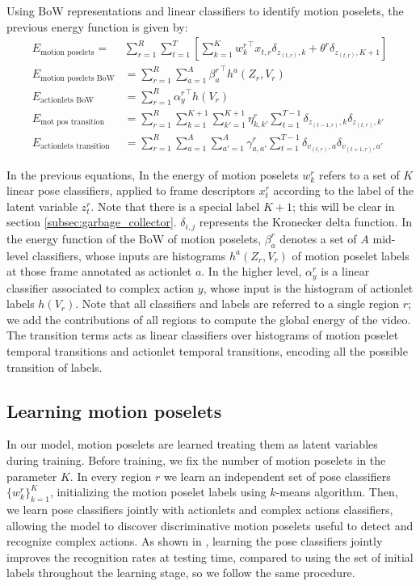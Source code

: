 Using BoW representations and linear classifiers to identify motion poselets, 
the previous energy function is given by:
{\small
\begin{align}
\label{eq:motionposelets}E_{\text{motion poselets}}  =  &\sum_{r=1}^R\sum_{t=1}^T  \left[ \sum_{k=1}^K {w^r_k}^\top 
x_{t,r}\delta_{z_{(t,r)},k} + \theta^r \delta_{z_{(t,r)},K+1}\right] \\
E_{\text{motion poselets BoW}} & = \sum_{r=1}^R \sum_{a=1}^A {\beta^r_{a}}^\top 
h^{a}(Z_r,V_r) \\
\label{eq:actionlets_BoW} E_{\text{actionlets BoW}} &=\sum_{r=1}^R {\alpha^r_{y}}^\top h(V_r)  \\
E_{\text{mot pos transition}} & = \sum_{r=1}^R\sum_{k=1}^{K+1}\sum_{k'=1}^{K+1} \eta^r_{k,k'} 
\sum_{t=1}^{T-1} \delta_{z_{(t-1,r)},k}\delta_{z_{(t,r)},k'}\\
E_{\text{actionlets transition}} & =\sum_{r=1}^R\sum_{a=1}^A\sum_{a'=1}^A \gamma^r_{a,a'} 
\sum_{t=1}^{T-1} 
\delta_{v_{(t,r)},a}\delta_{v_{(t+1,r)},a'} 
\end{align}
}


In the previous equations, In the energy of motion poselets $w^r_k$ refers to a set of $K$ linear pose classifiers, applied to frame descriptors $x_t^r$ according to the label of the latent variable $z_t^r$. Note that there is a special label $K+1$; this will be clear in section \ref{subsec:garbage_collector}. $\delta_{i,j}$ represents the Kronecker delta function. In the energy function of the BoW of motion poselets, $\beta_a^r$ denotes a set of $A$ mid-level classifiers, whose inputs are histograms $h^a(Z_r,V_r)$ of motion poselet labels at those frame annotated as actionlet $a$. In the higher level, $\alpha^r_{y}$ is a linear classifier  associated to complex action $y$, whose input is the histogram of actionlet labels $h(V_r)$. Note that all classifiers and labels are referred to a single region $r$; we add the contributions of all regions to compute the global energy of the video. The transition terms acts as linear classifiers over histograms of motion poselet temporal transitions and actionlet temporal transitions, encoding all the possible transition of labels. 

\subsection{Learning motion poselets}
In our model, motion poselets are learned treating them as latent variables during training. Before training, we fix the number of motion poselets in the parameter $K$. In every region $r$ we learn an independent set of pose classifiers $\{w^r_k\}_{k=1}^K$, initializing the motion poselet labels using $k$-means algorithm. Then, we learn pose classifiers jointly with actionlets and complex actions classifiers, allowing the model to discover discriminative motion poselets useful to detect and recognize complex actions. As shown in \cite{Lillo2014}, learning the pose classifiers jointly improves the recognition rates at testing time, compared to using the set of initial labels throughout the learning stage, so we follow the same procedure.   


